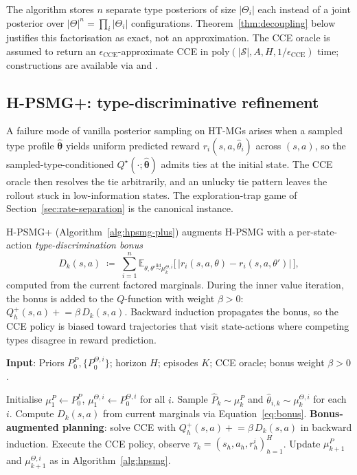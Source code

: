 \documentclass{article}
\def\textsuperscript#1{#1}%
\begin{document}
The algorithm stores $n$ separate type posteriors of size $|\Theta_i|$ each instead of a joint posterior over $|\Theta|^n = \prod_i |\Theta_i|$ configurations. Theorem~\ref{thm:decoupling} below justifies this factorisation as exact, not an approximation. The CCE oracle is assumed to return an $\epsilon_{\mathrm{CCE}}$-approximate CCE in $\mathrm{poly}(|\mathcal{S}|, A, H, 1/\epsilon_{\mathrm{CCE}})$ time; constructions are available via \citet{jin2021v} and \citet{mao2023decentralized}.

\subsection{H-PSMG\textsuperscript{+}: type-discriminative refinement}
\label{sec:hpsmg-plus-algo}

A failure mode of vanilla posterior sampling on HT-MGs arises when a sampled type profile $\hat{\boldsymbol{\theta}}$ yields uniform predicted reward $r_i(s, a, \hat\theta_i)$ across $(s, a)$, so the sampled-type-conditioned $Q^\star(\cdot; \hat{\boldsymbol{\theta}})$ admits ties at the initial state. The CCE oracle then resolves the tie arbitrarily, and an unlucky tie pattern leaves the rollout stuck in low-information states. The exploration-trap game of Section~\ref{sec:rate-separation} is the canonical instance.

H-PSMG\textsuperscript{+} (Algorithm~\ref{alg:hpsmg-plus}) augments H-PSMG with a per-state-action \emph{type-discrimination bonus}
\begin{equation}
\label{eq:bonus}
D_k(s, a) \;\coloneqq\; \sum_{i=1}^n \mathbb{E}_{\theta, \theta' \stackrel{\mathrm{iid}}{\sim} \mu_k^{\Theta, i}}\!\Big[\,\big|r_i(s, a, \theta) - r_i(s, a, \theta')\big|\,\Big],
\end{equation}
computed from the current factored marginals. During the inner value iteration, the bonus is added to the $Q$-function with weight $\beta > 0$: $Q^+_h(s, a) \mathrel{+}= \beta\, D_k(s, a)$. Backward induction propagates the bonus, so the CCE policy is biased toward trajectories that visit state-actions where competing types disagree in reward prediction.

\begin{algorithm}[ht]
\caption{H-PSMG\textsuperscript{+}: H-PSMG with type-discrimination bonus}
\label{alg:hpsmg-plus}
\textbf{Input}: Priors $P_0^P, \{P_0^{\Theta,i}\}$; horizon $H$; episodes $K$; CCE oracle; bonus weight $\beta > 0$.
\begin{algorithmic}[1]
\STATE Initialise $\mu_1^P \gets P_0^P$, $\mu_1^{\Theta, i} \gets P_0^{\Theta, i}$ for all $i$.
  \STATE Sample $\hat P_k \sim \mu_k^P$ and $\hat\theta_{i,k} \sim \mu_k^{\Theta, i}$ for each $i$.
  \STATE Compute $D_k(s, a)$ from current marginals via Equation~\eqref{eq:bonus}.
  \STATE \textbf{Bonus-augmented planning}: solve CCE with $Q^+_h(s, a) \mathrel{+}= \beta\, D_k(s, a)$ in backward induction.
  \STATE Execute the CCE policy, observe $\tau_k = (s_h, a_h, r_h^i)_{h=1}^H$.
  \STATE Update $\mu_{k+1}^P$ and $\mu_{k+1}^{\Theta, i}$ as in Algorithm~\ref{alg:hpsmg}.
\ENDFOR
\end{algorithmic}
\end{algorithm}
\end{document}
